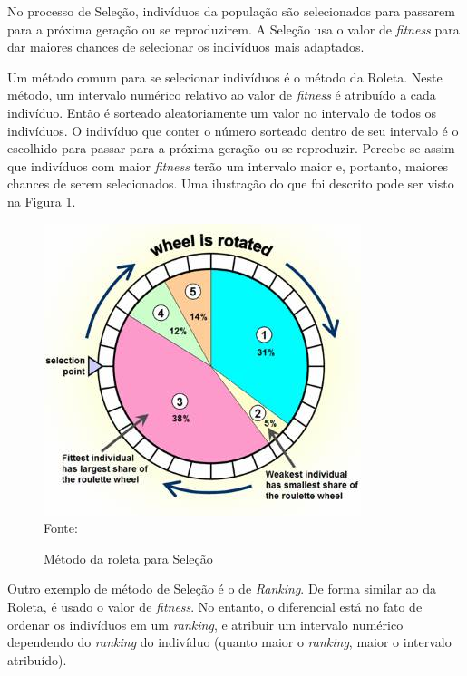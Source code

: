 \documentclass[
	12pt,					%
	openright,				%
	oneside,				%
	a4paper,				%
	bibjustif,				%
	chapter=TITLE,			%
	english,				%
	brazil,					%
	]{abntex2}
\newcommand{\source}[1]{\small Fonte: {#1}}
\begin{document}
	No processo de Seleção,
	indivíduos da população são selecionados para passarem para a próxima geração ou se reproduzirem.
	A Seleção usa o valor de \textit{fitness} para dar maiores chances de selecionar os indivíduos mais adaptados.
	
	Um método comum para se selecionar indivíduos é o método da Roleta.
	Neste método, um intervalo numérico relativo ao valor de \textit{fitness} é atribuído a cada indivíduo.
	Então é sorteado aleatoriamente um valor no intervalo de todos os indivíduos.
	O indivíduo que conter o número sorteado dentro de seu intervalo é o escolhido para passar para a próxima geração ou se reproduzir.
	Percebe-se assim que indivíduos com maior \textit{fitness} terão um intervalo maior e, portanto, maiores chances de serem selecionados.
	Uma ilustração do que foi descrito pode ser visto na Figura \ref{fig:roulette}.
	
	\begin{figure}[ht!]
		\centering
		\caption{Método da roleta para Seleção}
		\includegraphics[scale=0.8]{img/Roulette.jpg}\\
		\vspace{0.5mm}
		\source{}
		\label{fig:roulette}
	\end{figure}
	
	Outro exemplo de método de Seleção é o de \textit{Ranking}.
	De forma similar ao da Roleta, é usado o valor de \textit{fitness}.
	No entanto, o diferencial está no fato de ordenar os indivíduos em um \textit{ranking},
	e atribuir um intervalo numérico dependendo do \textit{ranking} do indivíduo
	(quanto maior o \textit{ranking}, maior o intervalo atribuído).
	
\end{document}
